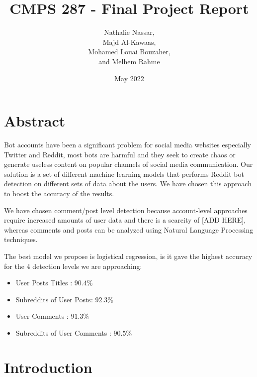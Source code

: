 \documentclass{article}
\title{CMPS 287 - Final Project Report}
\author{Nathalie Nassar, \\Majd Al-Kawaas,\\ Mohamed Louai Bouzaher,\\ and Melhem Rahme}
\date{May 2022}
\begin{document}
\maketitle

\section{Abstract}
Bot accounts have been a significant problem for social media websites especially Twitter and Reddit, most bots are harmful and they seek to create chaos or generate useless content on popular channels of social media communication. Our solution is a set of different machine learning models that performs Reddit bot detection on different sets of data about the users. We have chosen this approach to boost the accuracy of the results. \par

We have chosen comment/post level detection because account-level approaches require increased amounts of user data and there is a scarcity of [ADD HERE], whereas comments and posts can be analyzed using Natural Language Processing techniques.\par

The best model we propose is logistical regression, is it gave the highest accuracy for the 4 detection levels  we are approaching: \\
\begin{itemize}
\item User Posts Titles : $90.4\%$
\item Subreddits of User Posts: $92.3\%$
\item User Comments : $91.3\%$
\item Subreddits of User Comments : $90.5\%$

\end{itemize}

\section{Introduction}
\end{document}
